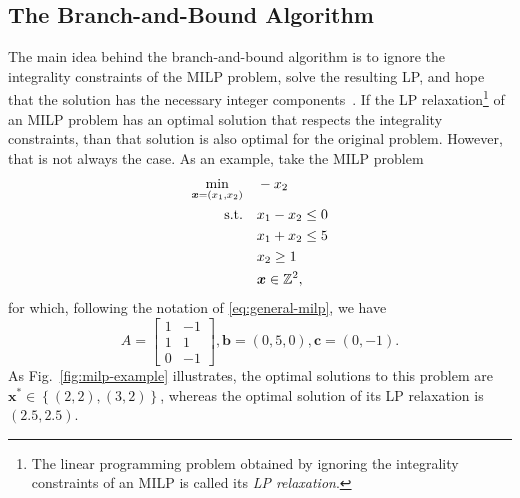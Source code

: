 \subsection{The Branch-and-Bound Algorithm}

The main idea behind the branch-and-bound algorithm is to ignore the integrality constraints of the MILP problem, solve the resulting LP, and hope that the solution has the necessary integer components~\cite{vanderbeiLinearProgrammingFoundations1998}.
If the LP relaxation\footnote{The linear programming problem obtained by ignoring the integrality constraints of an MILP is called its \emph{LP relaxation}.} of an MILP problem has an optimal solution that respects the integrality constraints, than that solution is also optimal for the original problem.
However, that is not always the case.
As an example, take the MILP problem
\begin{equation}\label{eq:example-milp}
\begin{split}
    \min_{\bm{x}=(x_1,x_2)} \quad & -x_2 \\
    \textrm{s.t.} \quad & x_1 - x_2\le 0 \\
      & x_1+x_2 \le 5 \\
      & x_2 \ge 1 \\
      & \bm{x} \in \mathbb{Z}^2
,\end{split}
\end{equation}
for which, following the notation of \eqref{eq:general-milp}, we have \[
A=\begin{bmatrix} 1 & -1 \\ 1 & 1 \\0 & -1 \end{bmatrix}, \bm{b} = (0, 5, 0), \bm{c} = (0, -1) 
.\]
As Fig.~\ref{fig:milp-example} illustrates, the optimal solutions to this problem are $\bm{x}^{*} \in \left\{ (2,2),(3,2) \right\} $, whereas the optimal solution of its LP relaxation is $(2.5, 2.5)$. 

